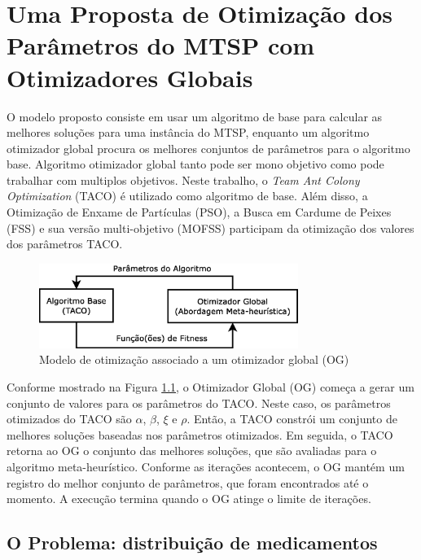 \chapter{Uma Proposta de Otimização dos Parâmetros do MTSP com Otimizadores Globais}

O modelo proposto consiste em usar um algoritmo de base para calcular as melhores soluções para uma instância do MTSP, enquanto um algoritmo otimizador global procura os melhores conjuntos de parâmetros para o algoritmo base. Algoritmo otimizador global tanto pode ser mono objetivo como pode trabalhar com multiplos objetivos. Neste trabalho, o \textit{Team Ant Colony Optimization} (TACO) é utilizado como algoritmo de base. Além disso, a Otimização de Enxame de Partículas (PSO), a Busca em Cardume de Peixes (FSS) e sua versão multi-objetivo (MOFSS) participam da otimização dos valores dos parâmetros TACO.

\begin{figure}[htb]
    \centering
    \caption{\label{fig:proposal-diag}Modelo de otimização associado a um otimizador global (OG)}
    \includegraphics[width=0.75\textwidth]{imagens/proposal-diag.eps}
\end{figure}

Conforme mostrado na Figura \ref{fig:proposal-diag}, o Otimizador Global (OG) começa a gerar um conjunto de valores para os parâmetros do TACO. Neste caso, os parâmetros otimizados do TACO são $\alpha$, $\beta$, $\xi$ e $\rho$. Então, a TACO constrói um conjunto de melhores soluções baseadas nos parâmetros otimizados. Em seguida, o TACO retorna ao OG o conjunto das melhores soluções, que são avaliadas para o algoritmo meta-heurístico. Conforme as iterações acontecem, o OG mantém um registro do melhor conjunto de parâmetros, que foram encontrados até o momento. A execução termina quando o OG atinge o limite de iterações.

\section{O Problema: distribuição de medicamentos}
\label{sec-metodologia-problema}

